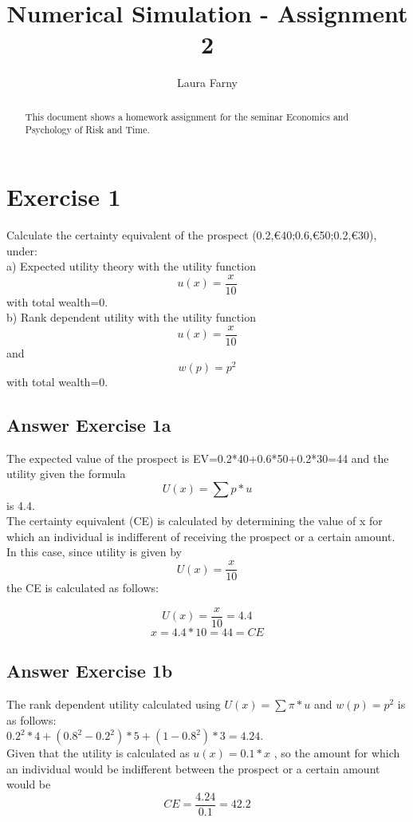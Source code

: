 \documentclass[12pt]{article}
\begin{document}
	
\title{Numerical Simulation - Assignment 2}
\author{Laura Farny}

{}


\begin{abstract}
	This document shows a homework assignment for the seminar Economics and Psychology of Risk and Time.
	
\end{abstract}

\section{Exercise 1}
Calculate the certainty equivalent of the prospect (0.2,€40;0.6,€50;0.2,€30), under: \\
a) Expected utility theory with the utility function \[u(x) = \frac{x}{10}\] with total wealth=0. \\
b) Rank dependent utility with the utility function \[u(x) = \frac{x}{10}\] and \[w(p) = p^{2}\] with total wealth=0.

\subsection{Answer Exercise 1a}
The expected value of the prospect is EV=0.2*40+0.6*50+0.2*30=44 and the utility given the formula \[U(x)=\sum p*u\] is 4.4.\\
The certainty equivalent (CE) is calculated by determining the value of x for which an individual is indifferent of receiving the prospect or a certain amount. In this case, since utility is given by \[U(x)=\frac{x}{10}\]  the CE is calculated as follows:

\[U(x)= \frac{x}{10} =4.4\]
\[x=4.4*10=44=CE\]

\subsection{Answer Exercise 1b}

The rank dependent utility calculated using \(U(x)=\sum \pi *u\) and \(w(p)=p^{2}\) is as follows: \\
\(0.2^{2}*4 + (0.8^{2}-0.2^{2})*5 + (1-0.8^{2})*3 = 4.24\). \\
Given that the utility is calculated as \(u(x)=0.1*x\) , so the amount for which an individual would be indifferent between the prospect or a certain amount would be \[CE=\frac{4.24}{0.1}=42.2\]
\end{document}
